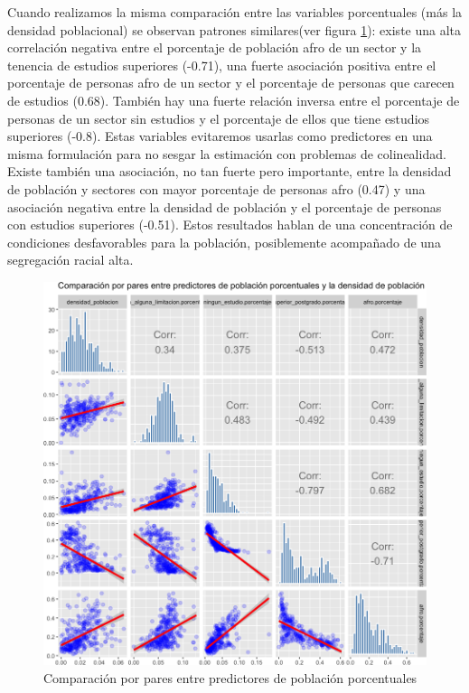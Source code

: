 \documentclass[12pt,]{book}
\begin{document}
Cuando realizamos la misma comparación entre las variables porcentuales
(más la densidad poblacional) se observan patrones similares(ver figura
\ref{fig:bivar-poblacion-mod}): existe una alta correlación negativa
entre el porcentaje de población afro de un sector y la tenencia de
estudios superiores (-0.71), una fuerte asociación positiva entre el
porcentaje de personas afro de un sector y el porcentaje de personas que
carecen de estudios (0.68). También hay una fuerte relación inversa
entre el porcentaje de personas de un sector sin estudios y el
porcentaje de ellos que tiene estudios superiores (-0.8). Estas
variables evitaremos usarlas como predictores en una misma formulación
para no sesgar la estimación con problemas de colinealidad. Existe
también una asociación, no tan fuerte pero importante, entre la densidad
de población y sectores con mayor porcentaje de personas afro (0.47) y
una asociación negativa entre la densidad de población y el porcentaje
de personas con estudios superiores (-0.51). Estos resultados hablan de
una concentración de condiciones desfavorables para la población,
posiblemente acompañado de una segregación racial alta.

\begin{figure}
\includegraphics[width=1\linewidth]{tesis-unigis_files/figure-latex/bivar-poblacion-mod-1} \caption{Comparación por pares entre predictores de población porcentuales}\label{fig:bivar-poblacion-mod}
\end{figure}
\end{document}
